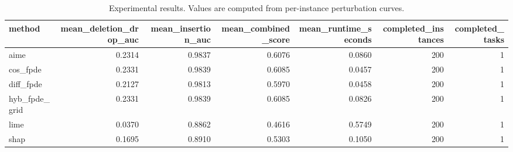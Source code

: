 \begin{table}[t]
\caption{Experimental results. Values are computed from per-instance perturbation curves.}
\label{tab:main_results_computed}
\centering
\begin{tabular}{lrrrrrr}
\toprule
method & mean\_deletion\_drop\_auc & mean\_insertion\_auc & mean\_combined\_score & mean\_runtime\_seconds & completed\_instances & completed\_tasks \\
\midrule
aime & 0.2314 & 0.9837 & 0.6076 & 0.0860 & 200 & 1 \\
cos\_fpde & 0.2331 & 0.9839 & 0.6085 & 0.0457 & 200 & 1 \\
diff\_fpde & 0.2127 & 0.9813 & 0.5970 & 0.0458 & 200 & 1 \\
hyb\_fpde\_grid & 0.2331 & 0.9839 & 0.6085 & 0.0826 & 200 & 1 \\
lime & 0.0370 & 0.8862 & 0.4616 & 0.5749 & 200 & 1 \\
shap & 0.1695 & 0.8910 & 0.5303 & 0.1050 & 200 & 1 \\
\bottomrule
\end{tabular}

\end{table}

